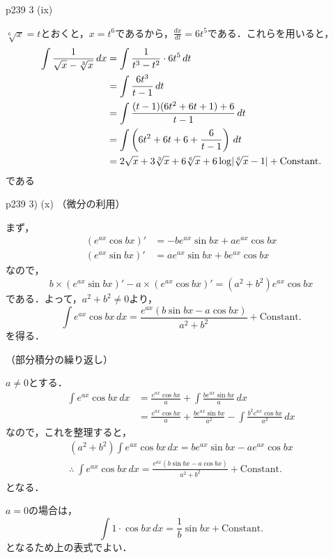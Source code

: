 \documentclass[dvipdfmx,uplatex,11pt]{jsarticle}
\DeclarePairedDelimiter\abs{\lvert}{\rvert}
\theoremstyle{definition}
\begin{document}
p239 3 (ix)

\begin{leftbar}
    $\sqrt[6]{x}=t$とおくと，$x=t^6$であるから，$\frac{dx}{dt}=6t^5$である．これらを用いると，
    \begin{align*}
        \int \frac{1}{\sqrt{x}-\sqrt[3]{x}} \, dx & = \int \frac{1}{t^3-t^2} \cdot 6t^5 \, dt \\
        & = \int \frac{6t^3}{t-1} \, dt \\
        & = \int \frac{(t-1)(6t^2+6t+1)+6}{t-1} \, dt \\
        & = \int \left (6t^2+6t+6 + \frac{6}{t-1}\right) \, dt \\
        & = 2\sqrt{x}+3 \sqrt[3]{x} + 6 \sqrt[6]{x} + 6 \log \abs{\sqrt[6]{x}-1}+ \mathrm{Constant.}
    \end{align*}
    である
\end{leftbar}

\newpage 

p239 3) (x)
%
（微分の利用）
\begin{leftbar}
    まず，
    \begin{align*}
        (e^{ax} \cos bx)' &= -b e^{ax} \sin b x + a e^{ax} \cos bx \\
        (e^{ax} \sin bx)' & = a e^{ax} \sin b x + b e^{ax} \cos bx
    \end{align*}
    なので，
    \[
         b \times (e^{ax} \sin bx)'-a \times (e^{ax} \cos bx)' = (a^2+b^2) e^{ax} \cos bx
    \]
    である．よって，$a^2 + b^2 \ne 0$より，
    \[
        \int e^{ax} \cos bx \, dx  = \frac{e^{ax}(b \sin bx- a \cos bx)}{a^2+b^2} + \mathrm{Constant.}
    \]
    を得る．
\end{leftbar}

（部分積分の繰り返し）
\begin{leftbar}
    $a \ne 0$とする．
    \begin{align*}
       \int e^{ax} \cos bx \, dx & = \frac{e^{ax} \cos bx}{a} + \int \frac{b e^{ax} \sin bx}{a} \, dx \\
       & = \frac{e^{ax} \cos bx}{a} + \frac{b e^{ax} \sin bx}{a^2} - \int \frac{b^2 e^{ax} \cos bx}{a^2} \, dx
    \end{align*}
    なので，これを整理すると，
    \begin{gather*}
        (a^2 + b^2) \int e^{ax} \cos bx  \, dx = b e^{ax} \sin bx - a e^{ax} \cos bx \\
        \therefore ~ \int e^{ax} \cos bx \, dx  = \frac{e^{ax}(b \sin bx- a \cos bx)}{a^2+b^2} + \mathrm{Constant.}
    \end{gather*}
    となる．

    $a =0$の場合は，
    \[
        \int 1 \cdot \cos bx \, dx = \frac{1}{b} \sin bx + \mathrm{Constant.}
    \]
    となるため上の表式でよい．
\end{leftbar}
\end{document}
